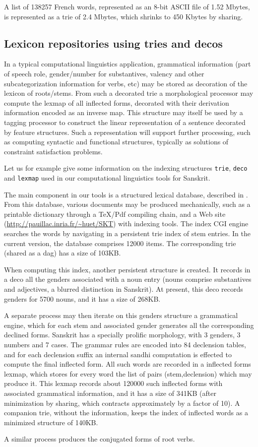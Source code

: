 A list of 138257 French words, represented as an 8-bit ASCII file of 1.52
Mbytes, is represented as a trie of 2.4 Mbytes, which shrinks to 450
Kbytes by sharing. 

\subsection{Lexicon repositories using tries and decos}

In a typical computational linguistics application, grammatical information
(part of speech role, gender/number for substantives, valency and other
subcategorization information for verbs, etc) may be stored as 
decoration of the lexicon of roots/stems. From such a decorated trie
a morphological processor may compute the lexmap of all inflected forms,
decorated with their derivation information encoded as an inverse map.
This structure may itself be used by a tagging processor 
to construct the linear representation of a 
sentence decorated by feature structures. Such a representation
will support further processing, such as computing
syntactic and functional structures, typically as solutions of
constraint satisfaction problems. 

Let us for example give some information on the indexing structures 
\verb|trie|, \verb|deco| and \verb|lexmap| used
in our computational linguistics tools for Sanskrit.

The main component in our tools is a structured lexical database,
described in \cite{dico-report,wcre}. From this database,
various documents may be produced mechanically, such as a
printable dictionary through a {\TeX}/Pdf 
compiling chain,
and a Web site (\url{http://pauillac.inria.fr/~huet/SKT}) 
with indexing tools. The index CGI engine searches the words
by navigating in a persistent trie index of stem entries. In the current 
version, the database comprises 12000 items.
The corresponding trie (shared as a dag) has a size of 103KB. 

When computing this index, another persistent structure is created. It
records in a deco all the genders associated with a noun entry
(nouns comprise substantives and adjectives, a blurred distinction in
Sanskrit). 
At present, this deco records genders for 5700 nouns, and it has
a size of 268KB. 

A separate process may then iterate on this genders structure a 
grammatical engine, which for each stem and associated gender generates
all the corresponding declined forms. Sanskrit has a specially 
prolific morphology, with 3 genders, 3 numbers and 7 cases. The grammar
rules are encoded into 84 declension tables, and for each declension 
suffix an internal sandhi computation is effected to compute the final 
inflected form. All such words are recorded in a inflected forms lexmap,
which stores for every word the list of
pairs (stem,declension) which may produce it. This lexmap records
about 120000 such inflected forms with associated grammatical
information, and it has a size of 341KB (after minimization by sharing, 
which contracts approximately by a factor of 10). 
A companion trie, without the information, keeps the index of inflected words 
as a minimized structure of 140KB. 

A similar process produces the conjugated forms of root verbs. 

